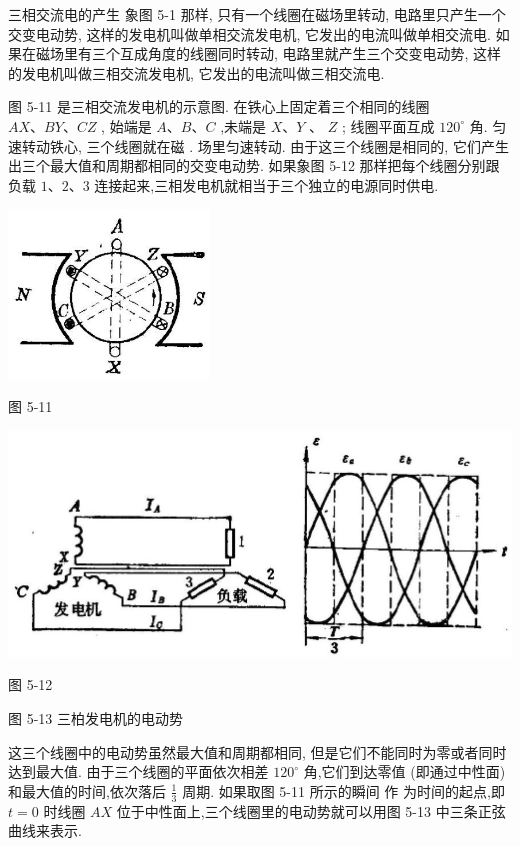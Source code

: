 \documentclass[10pt]{article}
\begin{document}
三相交流电的产生 象图 5-1 那样, 只有一个线圈在磁场里转动, 电路里只产生一个交变电动势, 这样的发电机叫做单相交流发电机, 它发出的电流叫做单相交流电. 如果在磁场里有三个互成角度的线圈同时转动, 电路里就产生三个交变电动势, 这样的发电机叫做三相交流发电机, 它发出的电流叫做三相交流电.

图 5-11 是三相交流发电机的示意图. 在铁心上固定着三个相同的线圈 \({AX}\text{、}{BY}\text{、}{CZ}\) , 始端是 \(A\text{、}B\text{、}C\) ,未端是 \(X\text{、}Y\) 、 \(Z\) ; 线圈平面互成 \({120}^{ \circ }\) 角. 匀速转动铁心, 三个线圈就在磁 . 场里匀速转动. 由于这三个线圈是相同的, 它们产生出三个最大值和周期都相同的交变电动势. 如果象图 5-12 那样把每个线圈分别跟负载 \(1\text{、}2\text{、}3\) 连接起来,三相发电机就相当于三个独立的电源同时供电.

\begin{center}
\includegraphics[max width=0.4\textwidth]{images/01913056-1f15-74d8-9184-9aab52c9d66b_174_667675.jpg}
\end{center}

图 5-11

\begin{center}
\includegraphics[max width=1.0\textwidth]{images/01913056-1f15-74d8-9184-9aab52c9d66b_174_545291.jpg}
\end{center}

图 5-12

图 5-13 三柏发电机的电动势

这三个线圈中的电动势虽然最大值和周期都相同, 但是它们不能同时为零或者同时达到最大值. 由于三个线圈的平面依次相差 \({120}^{ \circ }\) 角,它们到达零值 (即通过中性面) 和最大值的时间,依次落后 \(\frac{1}{3}\) 周期. 如果取图 5-11 所示的瞬间 作 为时间的起点,即 \(t = 0\) 时线圈 \({AX}\) 位于中性面上,三个线圈里的电动势就可以用图 5-13 中三条正弦曲线来表示.
\end{document}

